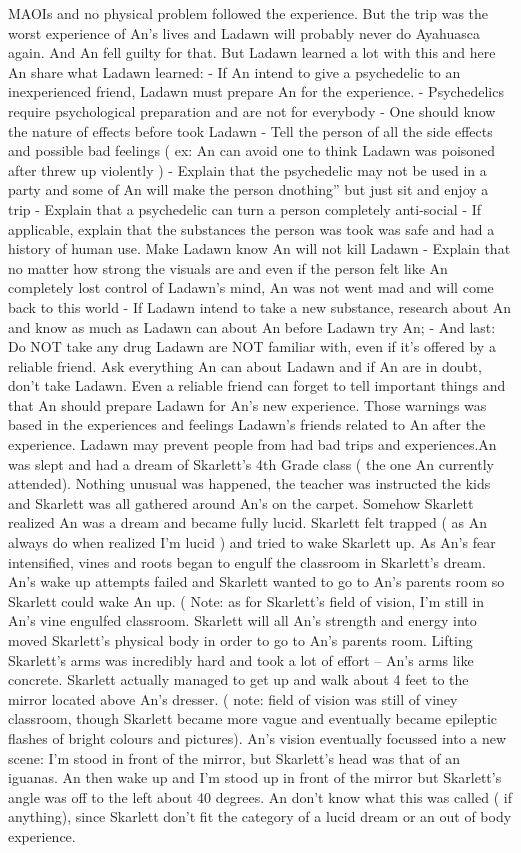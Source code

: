 \documentclass[12pt]{book}
\begin{document}
MAOIs and no physical problem followed the experience. But the trip was the worst experience of An's lives and Ladawn will probably never do Ayahuasca again. And An fell guilty for that. But Ladawn learned a lot with this and here An share what Ladawn learned: - If An intend to give a psychedelic to an inexperienced friend, Ladawn must prepare An for the experience. - Psychedelics require psychological preparation and are not for everybody - One should know the nature of effects before took Ladawn - Tell the person of all the side effects and possible bad feelings ( ex: An can avoid one to think Ladawn was poisoned after threw up violently ) - Explain that the psychedelic may not be used in a party and some of An will make the person dnothing'' but just sit and enjoy a trip - Explain that a psychedelic can turn a person completely anti-social - If applicable, explain that the substances the person was took was safe and had a history of human use. Make Ladawn know An will not kill Ladawn - Explain that no matter how strong the visuals are and even if the person felt like An completely lost control of Ladawn's mind, An was not went mad and will come back to this world - If Ladawn intend to take a new substance, research about An and know as much as Ladawn can about An before Ladawn try An; - And last: Do NOT take any drug Ladawn are NOT familiar with, even if it's offered by a reliable friend. Ask everything An can about Ladawn and if An are in doubt, don't take Ladawn. Even a reliable friend can forget to tell important things and that An should prepare Ladawn for An's new experience. Those warnings was based in the experiences and feelings Ladawn's friends related to An after the experience. Ladawn may prevent people from had bad trips and experiences.An was slept and had a dream of Skarlett's 4th Grade class ( the one An currently attended). Nothing unusual was happened, the teacher was instructed the kids and Skarlett was all gathered around An's on the carpet. Somehow Skarlett realized An was a dream and became fully lucid. Skarlett felt trapped ( as An always do when realized I'm lucid ) and tried to wake Skarlett up. As An's fear intensified, vines and roots began to engulf the classroom in Skarlett's dream. An's wake up attempts failed and Skarlett wanted to go to An's parents room so Skarlett could wake An up. ( Note: as for Skarlett's field of vision, I'm still in An's vine engulfed classroom. Skarlett will all An's strength and energy into moved Skarlett's physical body in order to go to An's parents room. Lifting Skarlett's arms was incredibly hard and took a lot of effort -- An's arms like concrete. Skarlett actually managed to get up and walk about 4 feet to the mirror located above An's dresser. ( note: field of vision was still of viney classroom, though Skarlett became more vague and eventually became epileptic flashes of bright colours and pictures). An's vision eventually focussed into a new scene: I'm stood in front of the mirror, but Skarlett's head was that of an iguanas. An then wake up and I'm stood up in front of the mirror but Skarlett's angle was off to the left about 40 degrees. An don't know what this was called ( if anything), since Skarlett don't fit the category of a lucid dream or an out of body experience.
\end{document}
